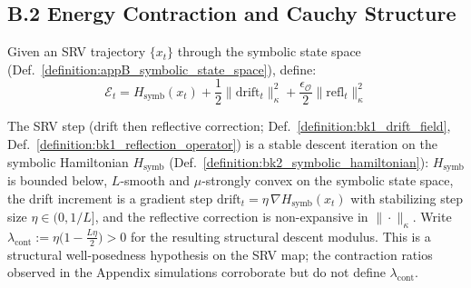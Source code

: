 \subsection*{B.2 Energy Contraction and Cauchy Structure}
\label{subsec:appB_cauchy}

\begin{definition}
\label{definition:appB_symbolic_energy}
Given an SRV trajectory $\{x_t\}$ through the symbolic state space (Def.~\ref{definition:appB_symbolic_state_space}), define:
\[
\mathcal{E}_t = H_{\text{symb}}(x_t) + \frac{1}{2}\|\text{drift}_t\|_\kappa^2 + \frac{\epsilon_{\mathcal{O}}}{2}\|\text{refl}_t\|_\kappa^2
\]
\end{definition}

\begin{assumption}
\label{assumption:appB_srv_dissipativity}
The SRV step (drift then reflective correction; Def.~\ref{definition:bk1_drift_field}, Def.~\ref{definition:bk1_reflection_operator}) is a stable descent iteration on the symbolic Hamiltonian $H_{\text{symb}}$ (Def.~\ref{definition:bk2_symbolic_hamiltonian}): $H_{\text{symb}}$ is bounded below, $L$-smooth and $\mu$-strongly convex on the symbolic state space, the drift increment is a gradient step $\text{drift}_t=\eta\,\nabla H_{\text{symb}}(x_t)$ with stabilizing step size $\eta\in(0,1/L]$, and the reflective correction is non-expansive in $\|\cdot\|_\kappa$. Write $\lambda_{\text{cont}}:=\eta\big(1-\tfrac{L\eta}{2}\big)>0$ for the resulting structural descent modulus. This is a structural well-posedness hypothesis on the SRV map; the contraction ratios observed in the Appendix simulations corroborate but do not define $\lambda_{\text{cont}}$.
\end{assumption}

